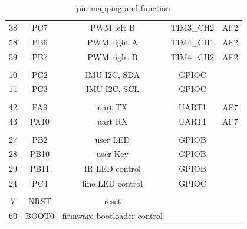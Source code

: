 \documentclass[12pt,twoside,onecolumn,openany,extrafontsizes,dvipsnames]{memoir}
\begin{document}
\begin{table}[h!]
\begin{tabular}{||c c c c c||}
                38 & PC7 & PWM left B   & TIM3\_CH2 & AF2 \\ 
                58 & PB6 & PWM right A  & TIM4\_CH1 & AF2 \\ 
                59 & PB7 & PWM right B  & TIM4\_CH2 & AF2 \\ 
                & & & & \\
                10 & PC2 & IMU I2C, SDA & GPIOC &  \\ 
                11 & PC3 & IMU I2C, SCL & GPIOC &  \\ 
                & & & & \\
                42 & PA9 & uart TX & UART1 & AF7 \\ 
                43 & PA10 & uart RX & UART1 & AF7 \\ 
                & & & & \\
                27 & PB2 & user LED & GPIOB &  \\ 
                28 & PB10 & user Key & GPIOB &  \\ 
                29 & PB11 & IR LED control & GPIOB &  \\ 
                24 & PC4 & line LED control & GPIOC &  \\ 
                & & & & \\
                7 & NRST & reset &  &  \\ 
                60 & BOOT0 & firmware bootloader control &  &  \\ 
            \hline
            \end{tabular}
        \caption{pin mapping and function}
        \label{table:1}
    \end{table}
\end{document}
